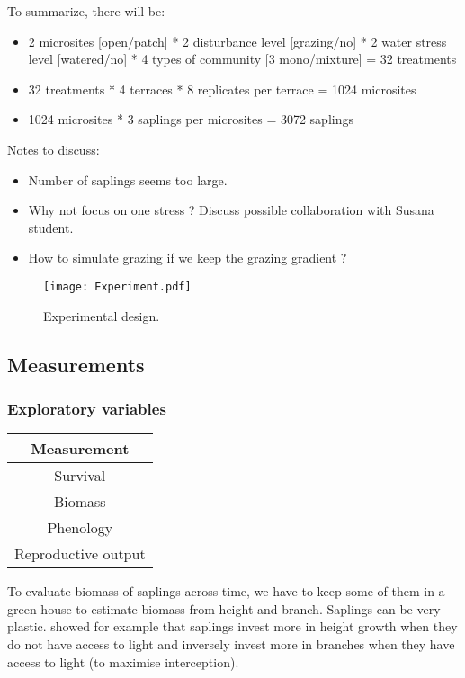 \documentclass[12pt]{article} %
\begin{document}
To summarize, there will be:
\begin{itemize} %
\item 2 microsites [open/patch] * 2 disturbance level [grazing/no] * 2 water stress level [watered/no] * 4 types of community [3 mono/mixture] = 32 treatments
\item 32 treatments * 4 terraces * 8 replicates per terrace = 1024 microsites
\item 1024 microsites * 3 saplings per microsites = 3072 saplings 
\end{itemize}

Notes to discuss:
\begin{itemize}
	\item Number of saplings seems too large.
	\item Why not focus on one stress ? Discuss possible collaboration with Susana student.
	\item How to simulate grazing if we keep the grazing gradient ?
\end{itemize}

\begin{figure} %
\begin{center}
\texttt{[image: Experiment.pdf]}
\end{center}
\caption{Experimental design.\label{exp}}
\end{figure}

\subsection{Measurements}

\subsubsection{Exploratory variables}
\begin{table}[h]
\begin{center}
\begin{tabular}{c}
Measurement \\ 
\hline
Survival \\ 
Biomass \\ 
Phenology \\ 
Reproductive output \\
\hline 
\end{tabular}
\end{center}
\end{table} 
To evaluate biomass of saplings across time, we have to keep some of them in a green house to estimate biomass from height and branch. Saplings can be very plastic. \citep{Bonser1994} showed for example that saplings invest more in height growth when they do not have access to light and inversely invest more in branches when they have access to light (to maximise interception). 
\end{document}
